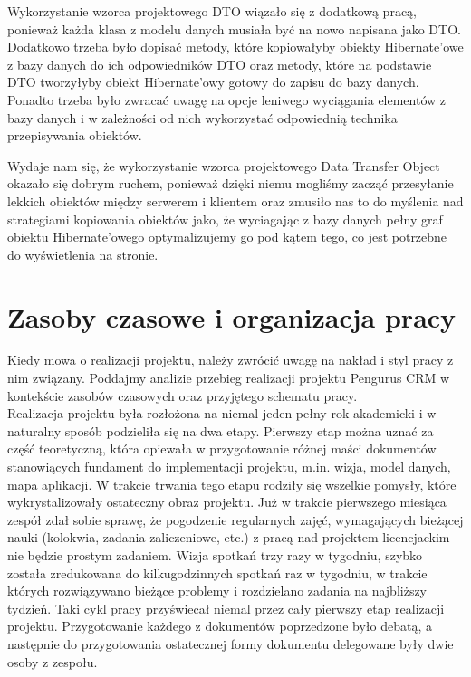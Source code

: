 \documentclass[licencjacka]{pracamgr}
\begin{document}
Wykorzystanie wzorca projektowego DTO wiązało się z dodatkową pracą, ponieważ każda klasa z modelu danych musiała być na nowo napisana jako DTO. Dodatkowo 
trzeba było dopisać metody, które kopiowałyby obiekty Hibernate'owe z bazy danych do ich odpowiedników DTO oraz metody, które na podstawie DTO tworzyłyby obiekt 
Hibernate'owy gotowy do zapisu do bazy danych. Ponadto trzeba było zwracać uwagę na opcje leniwego wyciągania elementów z bazy danych i w zależności od nich 
wykorzystać odpowiednią technika przepisywania obiektów.

Wydaje nam się, że wykorzystanie wzorca projektowego Data Transfer Object okazało się dobrym ruchem, ponieważ dzięki niemu mogliśmy zacząć przesyłanie lekkich 
obiektów między serwerem i klientem oraz zmusiło nas to do myślenia nad strategiami kopiowania obiektów jako, że wyciagając z bazy danych pełny graf 
obiektu Hibernate'owego optymalizujemy go pod kątem tego, co jest potrzebne do wyświetlenia na stronie.

\section{Zasoby czasowe i organizacja pracy}
Kiedy mowa o realizacji projektu, należy zwrócić uwagę na nakład i styl pracy z nim związany. 
Poddajmy analizie przebieg realizacji projektu Pengurus CRM w kontekście zasobów czasowych oraz przyjętego schematu pracy.\\

Realizacja projektu była rozłożona na niemal jeden pełny rok akademicki i w naturalny sposób podzieliła się na dwa etapy. 
Pierwszy etap można uznać za część teoretyczną, która opiewała w przygotowanie różnej maści dokumentów stanowiących fundament do implementacji projektu, 
m.in. wizja, model danych, mapa aplikacji.
W trakcie trwania tego etapu rodziły się wszelkie pomysły, które wykrystalizowały ostateczny obraz projektu. 
Już w trakcie pierwszego miesiąca zespół zdał sobie sprawę, że pogodzenie regularnych zajęć, wymagających bieżącej nauki
(kolokwia, zadania zaliczeniowe, etc.) z pracą nad projektem licencjackim nie będzie prostym zadaniem. 
Wizja spotkań trzy razy w tygodniu, szybko została zredukowana do kilkugodzinnych spotkań raz w tygodniu, 
w trakcie których rozwiązywano bieżące problemy i rozdzielano zadania na najbliższy tydzień. 
Taki cykl pracy przyświecał niemal przez cały pierwszy etap realizacji projektu.
Przygotowanie każdego z dokumentów poprzedzone było debatą, 
a następnie do przygotowania ostatecznej formy dokumentu delegowane były dwie osoby z zespołu.\\
\end{document}
